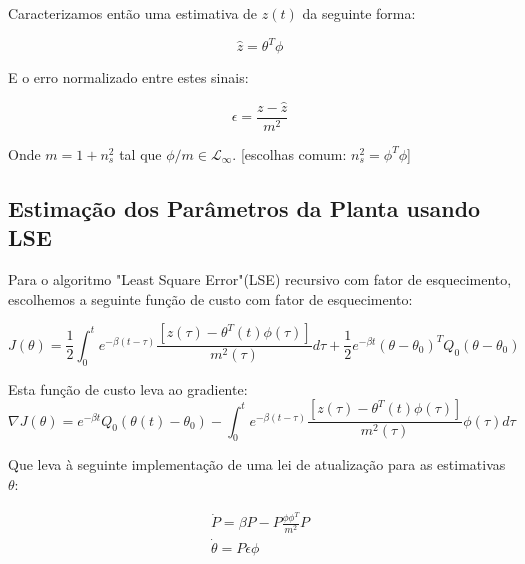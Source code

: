 \documentclass[aspectratio=169]{beamer}
\begin{document}
\begin{frame}
Caracterizamos então uma estimativa de $z(t)$ da seguinte forma:

\begin{equation*}
\hat{z} = \theta^T \phi
\end{equation*}

E o erro normalizado entre estes sinais:

\begin{equation*}
\epsilon = \frac{z - \hat{z}}{m^2}
\end{equation*}

Onde $m = 1+n_s^2$ tal que $\phi/m \in \mathcal{L}_\infty$. [escolhas comum: $n_s^2 = \phi^T\phi$]

\end{frame}

\subsection{Estimação dos Parâmetros da Planta usando LSE}
\begin{frame}
Para o algoritmo "Least Square Error"(LSE) recursivo com fator de esquecimento, escolhemos a seguinte função de custo com fator de esquecimento:

\begin{equation*}
 J(\theta) = \frac{1}{2} \int_{0}^{t} e^{-\beta(t - \tau)} \frac{[z(\tau) - \theta^T(t)\phi(\tau)]}{m^2(\tau)} d\tau
        + \frac{1}{2} e^{-\beta t}(\theta - \theta_0)^TQ_0(\theta - \theta_0)
\end{equation*}

\end{frame}

\begin{frame}
Esta função de custo leva ao gradiente:
\begin{equation*}
\nabla J(\theta) = e^{-\beta t}Q_0 (\theta(t)-\theta_0)
                    -\int_{0}^t e^{-\beta(t - \tau)} \frac{[z(\tau) - \theta^T(t)\phi(\tau)]}{m^2(\tau)}\phi(\tau) d\tau
\end{equation*}

Que leva à seguinte implementação de uma lei de atualização para as estimativas $\theta$:

\begin{equation*}
\begin{array}{l}
\dot{P} = \beta P - P\frac{\phi \phi^T}{m^2}P\\
\dot{\theta} = P\epsilon \phi
\end{array}
\end{equation*}

\end{frame}
\end{document}

